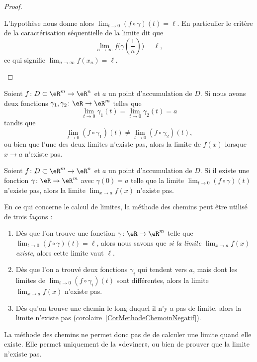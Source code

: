 \begin{proof}
\begin{subproof}
\begin{subproof}
                    L'hypothèse nous donne alors \( \lim_{t\to 0} (f\circ \gamma)(t)=\ell\). En particulier le critère de la caractérisation séquentielle de la limite dit que
                    \begin{equation}
                        \lim_{n\to \infty} f\big( \gamma(\frac{1}{ n }) \big)=\ell,
                    \end{equation}
                    ce qui signifie \( \lim_{n\to \infty} f(x_n)=\ell\).
            \end{subproof}
    \end{subproof}
\end{proof}

\begin{corollary}	\label{CorMethodeChemin}
	Soient $f\colon D\subset\eR^m\to \eR^n$ et $a$ un point d'accumulation de $D$. Si nous avons deux fonctions $\gamma_1,\gamma_2\colon \eR\to \eR^m$ telles que
	\begin{equation}
		\lim_{t\to 0} \gamma_1(t)=\lim_{t\to 0} \gamma_2(t)=a
	\end{equation}
	tandis que
	\begin{equation}
		\lim_{t\to 0} (f\circ \gamma_1)(t)\neq\lim_{t\to 0} (f\circ \gamma_2)(t),
	\end{equation}
	ou bien que l'une des deux limites n'existe pas, alors la limite de $f(x)$ lorsque $x\to a$ n'existe pas.
\end{corollary}

\begin{corollary}	\label{CorMethodeChemoinNegatif}
	Soient $f\colon D\subset\eR^m\to \eR^n$ et $a$ un point d'accumulation de $D$. Si il existe une fonction $\gamma\colon \eR\to \eR^m$ avec $\gamma(0)=a$ telle que la limite $\lim_{t\to 0} (f\circ\gamma)(t)$ n'existe pas, alors la limite $\lim_{x\to a} f(x)$ n'existe pas.
\end{corollary}

En ce qui concerne le calcul de limites, la méthode des chemins peut être utilisé de trois façons :
\begin{enumerate}
	\item
		Dès que l'on trouve une fonction $\gamma\colon \eR\to \eR^m$ telle que $\lim_{t\to 0} (f\circ \gamma)(t)=\ell$, alors nous savons que \emph{si la limite $\lim_{x\to a} f(x)$ existe}, alors cette limite vaut $\ell$.
	\item
		Dès que l'on a trouvé deux fonctions $\gamma_i$ qui tendent vers $a$, mais dont les limites de $\lim_{t\to 0} (f\circ\gamma_i)(t)$ sont différentes, alors la limite $\lim_{x\to a} f(x)$ n'existe pas.
	\item
		Dès qu'on trouve une chemin le long duquel il n'y a pas de limite, alors la limite n'existe pas (corolaire~\ref{CorMethodeChemoinNegatif}).
\end{enumerate}
La méthode des chemins ne permet donc pas de de calculer une limite quand elle existe. Elle permet uniquement de la «deviner», ou bien de prouver que la limite n'existe pas.

